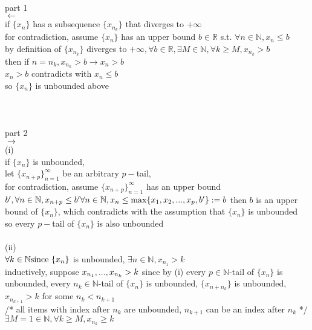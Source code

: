 \documentclass[12pt, border = 4pt, multi]{article} %
\begin{document}
\\
part 1\\
$\leftarrow$\\
if $\{x_n\}$ has a subsequence $\{x_{n_k}\}$ that diverges to $+\infty$\\
for contradiction, assume $\{x_n\}$ has an upper bound $b \in \mathbb{R}$ s.t. $\forall n \in \mathbb{N}, x_n \leq b$\\
by definition of $\{x_{n_k}\}$ diverges to $+\infty, \forall b \in \mathbb{R}, \exists M \in \mathbb{N}, \forall k \geq M, x_{n_k} > b$\\
then if $n = n_k, x_{n_k} > b \rightarrow x_n > b$\\
$x_n > b$ contradicts with $x_n \leq b$\\
so $\{x_n\}$ is unbounded above\\
\\
\\
\\
part 2\\
$\rightarrow$\\
(i)\\
if $\{x_n\}$ is unbounded,\\
let $\{x_{n + p}\}_{n = 1} ^ {\infty}$ be an arbitrary $p-$tail,\\
for contradiction, assume $\{x_{n + p}\}_{n = 1} ^ {\infty}$ has an upper bound $b', \forall n \in \mathbb{N}, x_{n + p} \leq b'\\
\forall n \in \mathbb{N}, x_n \leq \max\{x_1, x_2, ..., x_p, b'\} := b\\$
then $b$ is an upper bound of $\{x_n\}$, which contradicts with the assumption that $\{x_n\}$ is unbounded\\
so every $p-$tail of $\{x_n\}$ is also unbounded\\
\\
(ii)\\
$\forall k \in \mathbb{N}\\
\text{since }\{x_n\}$ is unbounded, $\exists n \in \mathbb{N}, x_{n_1} > k$\\
inductively, suppose $x_{n_1}, ..., x_{n_k} > k\\$
since by (i) every $p \in \mathbb{N}$-tail of $\{x_n\}$ is unbounded, every $n_k \in \mathbb{N}$-tail of $\{x_n\}$ is unbounded, $\{x_{n + n_k}\}$ is unbounded, $x_{n_{k + 1}} > k$ for some $n_k < n_{k + 1}$\\
/* all items with index after $n_k$ are unbounded, $n_{k + 1}$ can be an index after $n_k$ */\\
$\exists M = 1 \in \mathbb{N}, \forall k \geq M, x_{n_k} \geq k$\\
\end{document}

